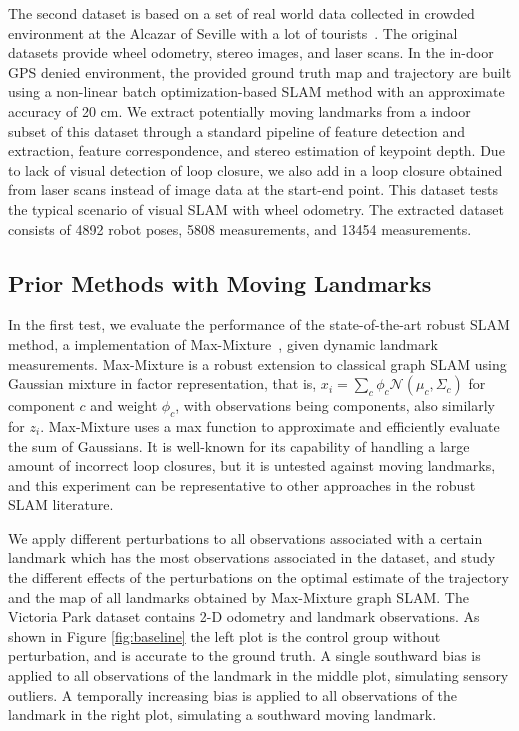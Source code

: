 The second dataset is based on a set of real world data collected in crowded
environment at the Alcazar of Seville with a lot of tourists~\cite{iros14-frog}.
The original datasets provide wheel odometry, stereo images, and laser scans.
In the in-door GPS denied environment, the provided ground truth map and
trajectory are built using a non-linear batch optimization-based SLAM method
with an approximate accuracy of 20 cm. We extract potentially moving landmarks
from a indoor subset of this dataset through a standard pipeline of feature
detection and extraction, feature correspondence, and stereo estimation of
keypoint depth.  Due to lack of visual detection of loop closure, we also add
in a loop closure obtained from laser scans instead of image data at the
start-end point. This dataset tests the typical scenario of visual SLAM with
wheel odometry. The extracted dataset consists of 4892 robot poses, 5808
measurements, and 13454 measurements.

\subsection{Prior Methods with Moving Landmarks}

In the first test, we evaluate the performance of the state-of-the-art robust
SLAM method, a implementation of Max-Mixture~\cite{mm}, given dynamic landmark measurements.
Max-Mixture is a robust extension to classical graph SLAM using Gaussian
mixture in factor representation, that is, $ x_i = \sum_c \phi_c
\mathcal{N}(\mu_c, \Sigma_c)$ for component $c$ and weight $\phi_c$, with
observations being components, also similarly for $z_i$. Max-Mixture uses a max
function to approximate and efficiently evaluate the sum of Gaussians. It is
well-known for its capability of handling a large amount of incorrect loop
closures, but it is untested against moving landmarks, and this experiment can
be representative to other approaches in the robust SLAM literature. 

We apply different perturbations to all observations associated with a certain
landmark which has the most observations associated in the dataset, and study
the different effects of the perturbations on the optimal estimate of the
trajectory and the map of all landmarks obtained by Max-Mixture graph SLAM. The
Victoria Park dataset contains 2-D odometry and landmark observations. As shown
in Figure \ref{fig:baseline} the left plot is the control group without
perturbation, and is accurate to the ground truth. A single southward bias is
applied to all observations of the landmark in the middle plot, simulating
sensory outliers. A temporally increasing bias is applied to all observations
of the landmark in the right plot, simulating a southward moving landmark.

